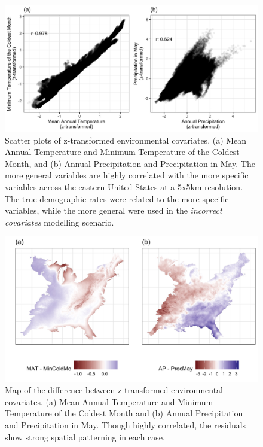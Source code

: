 \documentclass[]{article}
\begin{document}
\begin{figure}
    \centering
    \captionsetup{width=\linewidth}
    \includegraphics[width=\linewidth]{../../figs/Supp_CovScat.jpg}
    \caption{\label{fig:CovScatter} Scatter plots of z-transformed environmental covariates. (a) Mean Annual Temperature and Minimum Temperature of the Coldest Month, and (b) Annual Precipitation and Precipitation in May. The more general variables are highly correlated with the more specific variables across the eastern United States at a 5x5km resolution. The true demographic rates were related to the more specific variables, while the more general were used in the \emph{incorrect covariates} modelling scenario.}
\end{figure}
\begin{figure}
    \centering
    \captionsetup{width=\linewidth}
    \includegraphics[width=\linewidth]{../../figs/Supp_CovMap.jpg}
    \caption{\label{fig:CovMap} Map of the difference between z-transformed environmental covariates. (a) Mean Annual Temperature and Minimum Temperature of the Coldest Month and (b) Annual Precipitation and Precipitation in May. Though highly correlated, the residuals show strong spatial patterning in each case.}
\end{figure}
\end{document}
